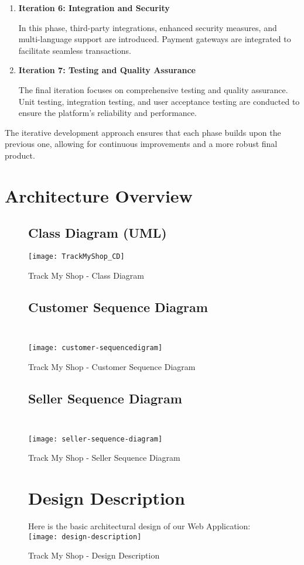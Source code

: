 \begin{enumerate}
	\item \textbf{Iteration 6: Integration and Security}
	
	In this phase, third-party integrations, enhanced security measures, and multi-language support are introduced. Payment gateways are integrated to facilitate seamless transactions.
	
	\item \textbf{Iteration 7: Testing and Quality Assurance}
	
	The final iteration focuses on comprehensive testing and quality assurance. Unit testing, integration testing, and user acceptance testing are conducted to ensure the platform's reliability and performance.
\end{enumerate}

The iterative development approach ensures that each phase builds upon the previous one, allowing for continuous improvements and a more robust final product.


\newpage

\section{Architecture Overview}


\begin{figure}[h]
	\subsection{Class Diagram (UML) }
	\centering
	\texttt{[image: TrackMyShop\_CD]}
	\caption{Track My Shop - Class Diagram}
\end{figure}

\pagebreak
\begin{figure}[h]
	\subsection{Customer Sequence Diagram \\\\}
	\centering
	\texttt{[image: customer-sequencedigram]}
	\caption{Track My Shop - Customer Sequence Diagram}
\end{figure}

\pagebreak
\begin{figure}[h]
	\subsection{Seller Sequence Diagram \\\\}
	\centering
	\texttt{[image: seller-sequence-diagram]}
	\caption{Track My Shop - Seller Sequence Diagram}
\end{figure}


\pagebreak

\begin{figure}[h]
	\section{Design Description}
	Here is the basic architectural design of our Web Application:\\
	\vspace{1.5cm}
	\centering
	\texttt{[image: design-description]}
	\caption{Track My Shop - Design Description}
\end{figure}
\pagebreak


